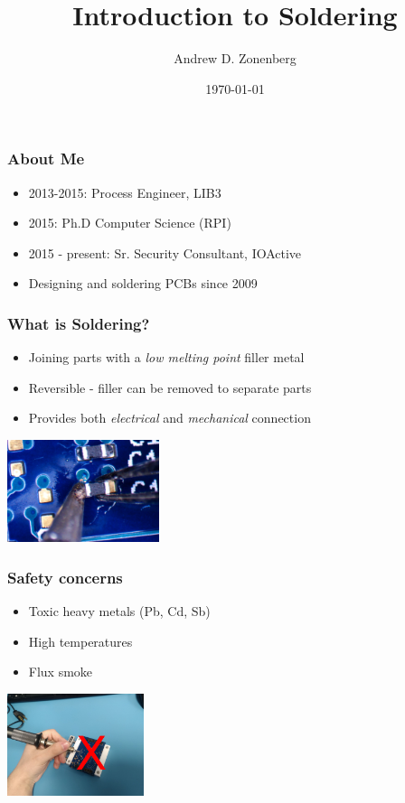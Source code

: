 \documentclass{beamer}
\title{Introduction to Soldering}
\author{Andrew D. Zonenberg}
\date{\today}
\begin{document}
\frame{\titlepage}

\begin{frame}
\frametitle{About Me}

\begin{itemize}
\item 2013-2015: Process Engineer, LIB3
\item 2015: Ph.D Computer Science (RPI)
\item 2015 - present: Sr. Security Consultant, IOActive
\item Designing and soldering PCBs since 2009
\end{itemize}
\end{frame}

\begin{frame}
\frametitle{What is Soldering?}
\begin{itemize}
\item Joining parts with a \emph{low melting point} filler metal
\item Reversible - filler can be removed to separate parts
\item Provides both \emph{electrical} and \emph{mechanical} connection
\end{itemize}
\begin{center}
\includegraphics[height=3cm,keepaspectratio]{intro-shot.jpg}
\end{center}
\end{frame}

\begin{frame}
\frametitle{Safety concerns}
\begin{itemize}
\item Toxic heavy metals (Pb, Cd, Sb)
\item High temperatures
\item Flux smoke
\end{itemize}
\begin{center}
\includegraphics[width=4cm,keepaspectratio]{safety.jpg}
\end{center}
\end{frame}
\end{document}
